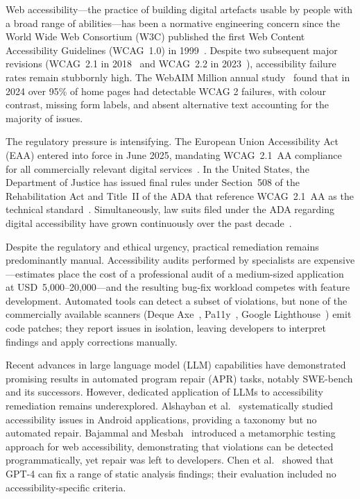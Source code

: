 \documentclass[10pt,conference]{IEEEtran}
\begin{document}
Web accessibility—the practice of building digital artefacts usable by people
with a broad range of abilities—has been a normative engineering concern since
the World Wide Web Consortium (W3C) published the first Web Content
Accessibility Guidelines (WCAG~1.0) in 1999~\cite{wcag1}.  Despite two
subsequent major revisions (WCAG~2.1 in 2018~\cite{wcag21} and WCAG~2.2 in
2023~\cite{wcag22}), accessibility failure rates remain stubbornly high.
The WebAIM Million annual study~\cite{webaim2024} found that in 2024 over
95\% of home pages had detectable WCAG 2 failures, with colour contrast,
missing form labels, and absent alternative text accounting for the majority
of issues.

The regulatory pressure is intensifying.  The European Union Accessibility
Act (EAA) entered into force in June 2025, mandating WCAG~2.1~AA compliance
for all commercially relevant digital services~\cite{eaa}.  In the United
States, the Department of Justice has issued final rules under Section~508 of
the Rehabilitation Act and Title~II of the ADA that reference WCAG~2.1~AA
as the technical standard~\cite{doj2024}.  Simultaneously, law suits filed
under the ADA regarding digital accessibility have grown continuously over
the past decade~\cite{usLawsuits2023}.

Despite the regulatory and ethical urgency, practical remediation remains
predominantly manual.  Accessibility audits performed by specialists are
expensive—estimates place the cost of a professional audit of a medium-sized
application at USD~5,000--20,000—and the resulting bug-fix workload competes
with feature development.  Automated tools can detect a subset of violations,
but none of the commercially available scanners (Deque Axe~\cite{axe},
Pa11y~\cite{pa11y}, Google Lighthouse~\cite{lighthouse}) emit code patches;
they report issues in isolation, leaving developers to interpret findings and
apply corrections manually.

Recent advances in large language model (LLM) capabilities have demonstrated
promising results in automated program repair (APR) tasks, notably SWE-bench
\cite{swebench} and its successors.  However, dedicated application of LLMs
to accessibility remediation remains underexplored.  Alshayban et al.\
\cite{alshayban2020} systematically studied accessibility issues in Android
applications, providing a taxonomy but no automated repair.  Bajammal and
Mesbah~\cite{bajammal2021} introduced a metamorphic testing approach for web
accessibility, demonstrating that violations can be detected programmatically,
yet repair was left to developers.  Chen et al.\ \cite{chen2023llm} showed
that GPT-4 can fix a range of static analysis findings; their evaluation
included no accessibility-specific criteria.
\end{document}
